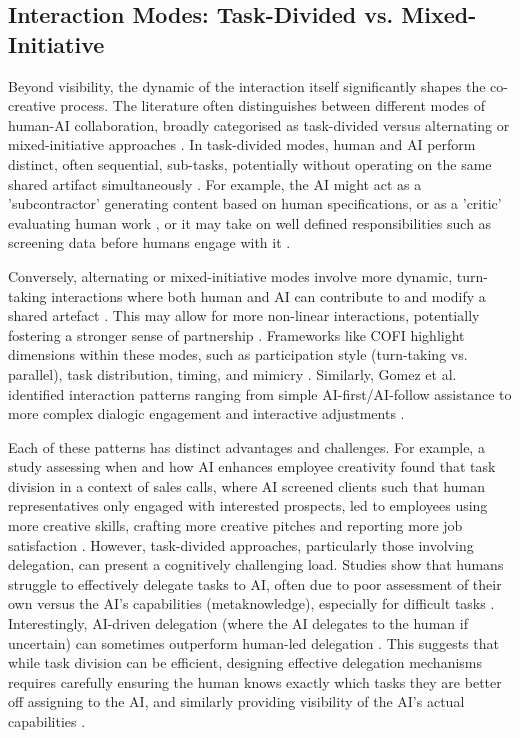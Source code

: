 \subsection{Interaction Modes: Task-Divided vs. Mixed-Initiative}

Beyond visibility, the dynamic of the interaction itself significantly shapes the co-creative process. The literature often distinguishes between different modes of human-AI collaboration, broadly categorised as task-divided versus alternating or mixed-initiative approaches \cite{Kantosalo2020-nh, Kantosalo2016-nm}. In task-divided modes, human and AI perform distinct, often sequential, sub-tasks, potentially without operating on the same shared artifact simultaneously \cite{Kantosalo2016-nm}. For example, the AI might act as a 'subcontractor' generating content based on human specifications, or as a 'critic' evaluating human work \cite{Lin2023-zq}, or it may take on well defined responsibilities such as screening data before humans engage with it \cite{Jia2024-vp}. 

Conversely, alternating or mixed-initiative modes involve more dynamic, turn-taking interactions where both human and AI can contribute to and modify a shared artefact \cite{Kantosalo2020-nh, Kantosalo2016-nm, Lin2023-zq}. This may allow for more non-linear interactions, potentially fostering a stronger sense of partnership \cite{Davis2016-te, Zhou2024-vp}. Frameworks like COFI highlight dimensions within these modes, such as participation style (turn-taking vs. parallel), task distribution, timing, and mimicry \cite{Rezwana2022-gg}. Similarly, Gomez et al. identified interaction patterns ranging from simple AI-first/AI-follow assistance to more complex dialogic engagement and interactive adjustments \cite{Gomez2023-bp}.

Each of these patterns has distinct advantages and challenges. For example, a study assessing when and how AI enhances employee creativity found that task division in a context of sales calls, where AI screened clients such that human representatives only engaged with interested prospects, led to employees using more creative skills, crafting more creative pitches and reporting more job satisfaction \cite{Jia2024-vp}. However, task-divided approaches, particularly those involving delegation, can present a cognitively challenging load. Studies show that humans struggle to effectively delegate tasks to AI, often due to poor assessment of their own versus the AI's capabilities (metaknowledge), especially for difficult tasks \cite{Fugener2019-yz}. Interestingly, AI-driven delegation (where the AI delegates to the human if uncertain) can sometimes outperform human-led delegation \cite{Fugener2019-yz}. This suggests that while task division can be efficient, designing effective delegation mechanisms requires carefully ensuring the human knows exactly which tasks they are better off assigning to the AI, and similarly providing visibility of the AI's actual capabilities \cite{Dell-Acqua2022-dy, Fugener2019-yz}.

